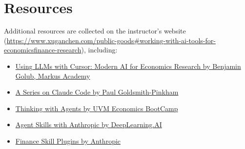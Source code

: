 \documentclass[11pt]{article}
\begin{document}
\section*{Resources}
Additional resources are collected on the instructor's website
(\url{https://www.xuganchen.com/public-goods\#working-with-ai-tools-for-economicsfinance-research}),
including:
\begin{itemize}
  \item \href{https://www.youtube.com/watch?v=gb9v5ze0zhU}{Using LLMs with Cursor: Modern AI for Economics Research by Benjamin Golub, Markus Academy}
  \item \href{https://paulgp.substack.com}{A Series on Claude Code by Paul Goldsmith-Pinkham}
  \item \href{https://thinkingwithagents.github.io}{Thinking with Agents by UVM Economics BootCamp}
  \item \href{https://www.deeplearning.ai/short-courses/agent-skills-with-anthropic/}{Agent Skills with Anthropic by DeepLearning.AI}
  \item \href{https://github.com/anthropics/financial-services}{Finance Skill Plugins by Anthropic}
\end{itemize}
\end{document}
